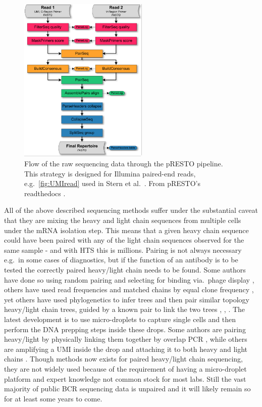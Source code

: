 \begin{figure}[ht]
    \centering
    \includegraphics[width=0.55\textwidth]{figures/Stern2014_Flowchart.pdf}
    \caption{
        \label{fig:UMIread_flow}
        Flow of the raw sequencing data through the pRESTO pipeline. This strategy is designed for Illumina paired-end reads, e.g.\ \ref{fig:UMIread} used in Stern et al.\ \cite{stern2014b}. From pRESTO's readthedocs \cite{vander2014presto}.
    }
\end{figure}


All of the above described sequencing methods suffer under the substantial caveat that they are mixing the heavy and light chain sequences from multiple cells under the mRNA isolation step.
This means that a given heavy chain sequence could have been paired with any of the light chain sequences observed for the same sample - and with HTS this is millions.
Pairing is not always necessary e.g.\ in some cases of diagnostics, but if the function of an antibody is to be tested the correctly paired heavy/light chain needs to be found.
Some authors have done so using random pairing and selecting for binding via.\ phage display \cite{glanville2009precise}, others have used read frequencies and matched chains by equal clone frequency \cite{reddy2010monoclonal}, yet others have used phylogenetics to infer trees and then pair similar topology heavy/light chain trees, guided by a known pair to link the two trees \cite{Zhu_undated-zz}, \cite{kwong2017antibodyomics}, \cite{huang2016identification}.
The latest development is to use micro-droplets to capture single cells and then perform the DNA prepping steps inside these drops.
Some authors are pairing heavy/light by physically linking them together by overlap PCR \cite{mcdaniel2016ultra}, while others are amplifying a UMI inside the drop and attaching it to both heavy and light chains \cite{Briggs134841}.
Though methods now exists for paired heavy/light chain sequencing, they are not widely used because of the requirement of having a micro-droplet platform and expert knowledge not common stock for most labs.
Still the vast majority of public BCR sequencing data is unpaired and it will likely remain so for at least some years to come.



